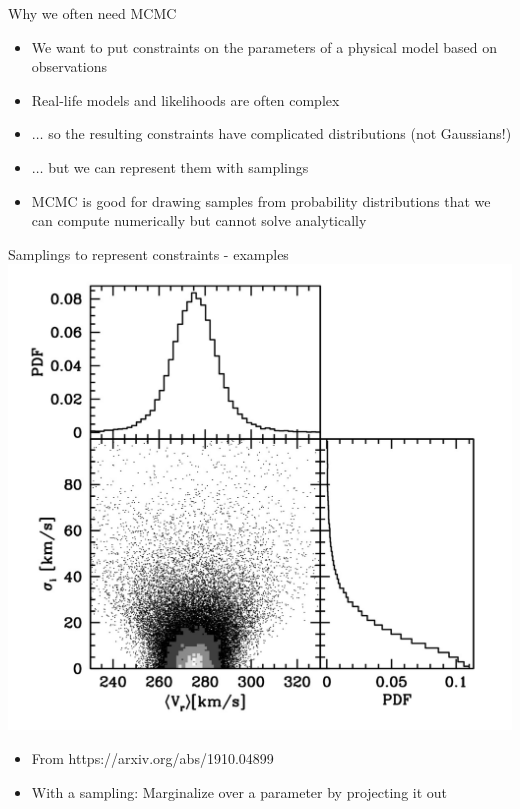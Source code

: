 \documentclass{beamer}
\begin{document}
\begin{frame}{Why we often need MCMC}
  \begin{itemize}
  \item We want to put \alert{constraints on the parameters} of a physical model
    \alert{based on observations}
  \item Real-life models and likelihoods are often complex
  \item $\ldots$ so the resulting \alert{constraints} have complicated distributions (not Gaussians!)
  \item $\ldots$ but we can represent them with \alert{samplings}
  \item MCMC is good for drawing samples from probability distributions
        that we can compute numerically but cannot solve analytically
  \end{itemize}
\end{frame}

\begin{frame}{Samplings to represent constraints - examples}
  \includegraphics[height=0.5\textwidth]{corner}
  \begin{itemize}
  \item From https://arxiv.org/abs/1910.04899
  \item With a sampling: \alert{Marginalize} over a parameter by projecting it out
  \end{itemize}
\end{frame}
\end{document}
